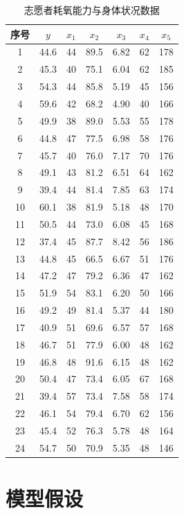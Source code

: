 \documentclass[12pt,a4paper]{article}
\begin{document}
\begin{table}[H]
\centering
\caption{志愿者耗氧能力与身体状况数据}
\label{tab:rawdata}
\begin{tabular}{ccccccc}
\toprule
序号 & $y$ & $x_1$ & $x_2$ & $x_3$ & $x_4$ & $x_5$ \\
\midrule
1 & 44.6 & 44 & 89.5 & 6.82 & 62 & 178 \\
2 & 45.3 & 40 & 75.1 & 6.04 & 62 & 185 \\
3 & 54.3 & 44 & 85.8 & 5.19 & 45 & 156 \\
4 & 59.6 & 42 & 68.2 & 4.90 & 40 & 166 \\
5 & 49.9 & 38 & 89.0 & 5.53 & 55 & 178 \\
6 & 44.8 & 47 & 77.5 & 6.98 & 58 & 176 \\
7 & 45.7 & 40 & 76.0 & 7.17 & 70 & 176 \\
8 & 49.1 & 43 & 81.2 & 6.51 & 64 & 162 \\
9 & 39.4 & 44 & 81.4 & 7.85 & 63 & 174 \\
10& 60.1 & 38 & 81.9 & 5.18 & 48 & 170 \\
11& 50.5 & 44 & 73.0 & 6.08 & 45 & 168 \\
12& 37.4 & 45 & 87.7 & 8.42 & 56 & 186 \\
13& 44.8 & 45 & 66.5 & 6.67 & 51 & 176 \\
14& 47.2 & 47 & 79.2 & 6.36 & 47 & 162 \\
15& 51.9 & 54 & 83.1 & 6.20 & 50 & 166 \\
16& 49.2 & 49 & 81.4 & 5.37 & 44 & 180 \\
17& 40.9 & 51 & 69.6 & 6.57 & 57 & 168 \\
18& 46.7 & 51 & 77.9 & 6.00 & 48 & 162 \\
19& 46.8 & 48 & 91.6 & 6.15 & 48 & 162 \\
20& 50.4 & 47 & 73.4 & 6.05 & 67 & 168 \\
21& 39.4 & 57 & 73.4 & 7.58 & 58 & 174 \\
22& 46.1 & 54 & 79.4 & 6.70 & 62 & 156 \\
23& 45.4 & 52 & 76.3 & 5.78 & 48 & 164 \\
24& 54.7 & 50 & 70.9 & 5.35 & 48 & 146 \\
\bottomrule
\end{tabular}
\end{table}

\section{模型假设}
\end{document}

